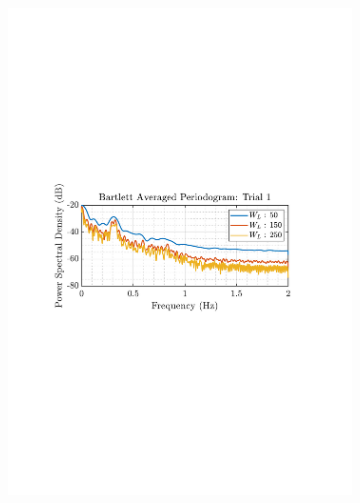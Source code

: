 \documentclass[12pt]{article}
\begin{document}
\begin{figure}[H]
\begin{subfigure}{0.49\textwidth}
			\includegraphics[trim={2.2cm 11cm 3.15cm  11.2cm}, clip, width=\textwidth]{../MATLAB/figures/q1_5a_fig04.pdf} 
		\end{subfigure}
		\begin{subfigure}{0.49\textwidth}
			\centering

\end{subfigure}
\end{figure}
\end{document}
